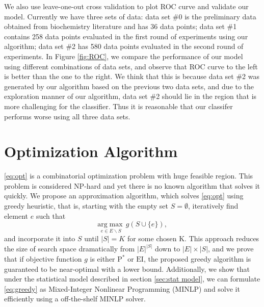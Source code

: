 \documentclass[12pt]{article}
\newcommand{\EI}{\mathrm{EI}}
\newcommand{\PI}{\text{P}^*}
\begin{document}
We also use leave-one-out cross validation to plot ROC curve and validate our model. Currently we have three sets of data: data set \#0 is the preliminary data obtained from biochemistry literature and has 36 data points; data set \#1 contains 258 data points evaluated in the first round of experiments using our algorithm; data set \#2 has 580 data points evaluated in the second round of experiments. In Figure \ref{fig:ROC}, we compare the performance of our model using different combinations of data sets, and observe that ROC curve to the left is better than the one to the right. We think that this is because data set \#2 was generated by our algorithm based on the previous two data sets, and due to the exploration manner of our algorithm, data set \#2 should lie in the region that is more challenging for the classifier. Thus it is reasonable that our classifer performs worse using all three data sets. 

\section{Optimization Algorithm}
\eqref{eq:opt} is a combinatorial optimization problem with huge feasible region. This problem is considered NP-hard and yet there is no known algorithm that solves it quickly. We propose an approximation algorithm, which solves \eqref{eq:opt} using greedy heuristic, that is, starting with the empty set $S=\emptyset$, iteratively find element $e$ such that 
\begin{equation} \label{eq:greedy}
  \underset{e \in E \backslash S}{\mathrm{arg}\max} \,g(S \cup \{e\}),
\end{equation}
and incorporate it into $S$ until $|S|=K$ for some chosen K. This approach reduces the size of search space dramatically from $|E|^{|S|}$ down to $|E| \times |S|$, and we prove that if objective function $g$ is either $\PI$ or $\EI$, the proposed greedy algorithm is guaranteed to be near-optimal with a lower bound. Additionally, we show that under the statistical model described in section \ref{sec:stat model}, we can formulate \eqref{eq:greedy} as Mixed-Integer Nonlinear Programming
(MINLP) and solve it efficiently using a off-the-shelf MINLP solver.
\end{document}
